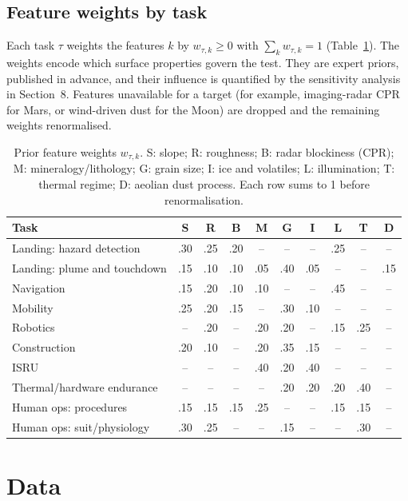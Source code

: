 \documentclass[11pt,a4paper]{article}
\begin{document}
\subsection{Feature weights by task}
Each task $\tau$ weights the features $k$ by $w_{\tau,k}\ge 0$ with $\sum_k w_{\tau,k}=1$ (Table~\ref{tab:weights}). The weights encode which surface properties govern the test. They are expert priors, published in advance, and their influence is quantified by the sensitivity analysis in Section~8. Features unavailable for a target (for example, imaging-radar CPR for Mars, or wind-driven dust for the Moon) are dropped and the remaining weights renormalised.

\begin{table}[htbp]
\centering
\caption{Prior feature weights $w_{\tau,k}$. S: slope; R: roughness; B: radar blockiness (CPR); M: mineralogy/lithology; G: grain size; I: ice and volatiles; L: illumination; T: thermal regime; D: aeolian dust process. Each row sums to 1 before renormalisation.}
\label{tab:weights}
\small
\begin{tabular}{lccccccccc}
\toprule
Task & S & R & B & M & G & I & L & T & D \\
\midrule
Landing: hazard detection & .30 & .25 & .20 & -- & -- & -- & .25 & -- & -- \\
Landing: plume and touchdown & .15 & .10 & .10 & .05 & .40 & .05 & -- & -- & .15 \\
Navigation & .15 & .20 & .10 & .10 & -- & -- & .45 & -- & -- \\
Mobility & .25 & .20 & .15 & -- & .30 & .10 & -- & -- & -- \\
Robotics & -- & .20 & -- & .20 & .20 & -- & .15 & .25 & -- \\
Construction & .20 & .10 & -- & .20 & .35 & .15 & -- & -- & -- \\
ISRU & -- & -- & -- & .40 & .20 & .40 & -- & -- & -- \\
Thermal/hardware endurance & -- & -- & -- & -- & .20 & .20 & .20 & .40 & -- \\
Human ops: procedures & .15 & .15 & .15 & .25 & -- & -- & .15 & .15 & -- \\
Human ops: suit/physiology & .30 & .25 & -- & -- & .15 & -- & -- & .30 & -- \\
\bottomrule
\end{tabular}
\end{table}

\section{Data}
\end{document}
